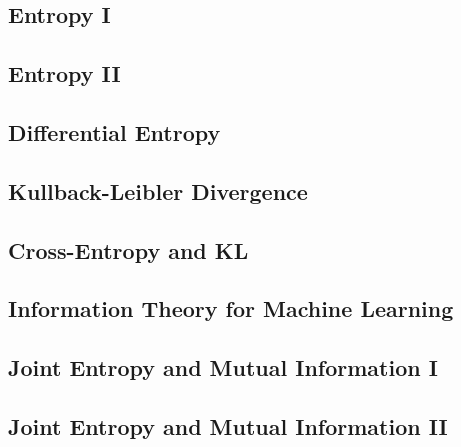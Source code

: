 
\subsection{Entropy I}


\subsection{Entropy II}


\subsection{Differential Entropy}


\subsection{Kullback-Leibler Divergence}


\subsection{Cross-Entropy and KL}


\subsection{Information Theory for Machine Learning}


\subsection{Joint Entropy and Mutual Information I}


\subsection{Joint Entropy and Mutual Information II}


